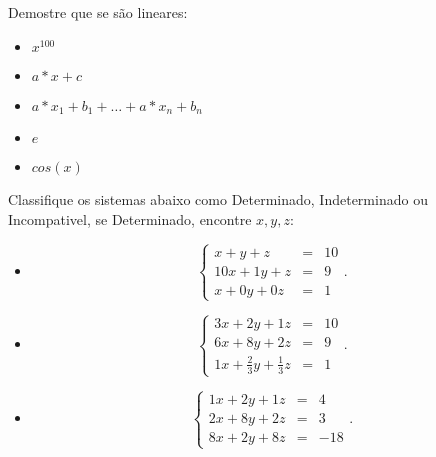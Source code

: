 \begin{exerc}
        Demostre que se são lineares:
        \begin{itemize}
            \item $x^{100}$
            \item $a*x+c$
            \item $a*x_1 + b_1 +\ldots+ a*x_n + b_n$
            \item $e$
            \item $cos(x)$
        \end{itemize}
\end{exerc}
\begin{exerc}
        Classifique os sistemas abaixo como Determinado, Indeterminado ou Incompativel,
        se Determinado, encontre $x,y,z$:
        \begin{itemize}
            \item \begin{equation}
                        \left\{
                            \begin{array}{rcl}
                                x+y+z&=&10 \\
                                10x+1y+z&=&9 \\
                                x+0y+0z&=&1
                            \end{array}
                        \right..
                   \end{equation}
            \item \begin{equation}
                        \left\{
                        \begin{array}{ccccc|c}
                            3x+2y+1z&=&10 \\
                            6x+8y+2z&=&9 \\
                            1x+\frac{2}{3}y+\frac{1}{3}z&=&1
                        \end{array}
                        \right..
                   \end{equation}
            \item  \begin{equation}
                        \left\{
                            \begin{array}{ccccc|c}
                                1x+2y+1z&=&4 \\
                                2x+8y+2z&=&3 \\
                                8x+2y+8z&=&-18
                            \end{array}
                        \right..
                    \end{equation}
        \end{itemize}
\end{exerc}

